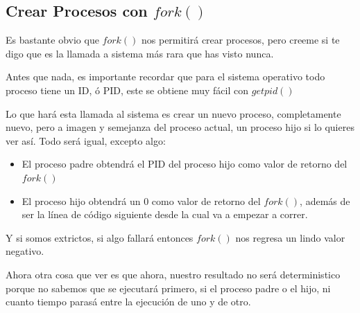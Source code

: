 \documentclass[12pt, fleqn]{report}                             %
\begin{document}
            \clearpage
            \subsection{Crear Procesos con $fork()$}

                Es bastante obvio que $fork()$ nos permitirá crear procesos,
                pero creeme si te digo que es la llamada a sistema más rara que has visto
                nunca.

                Antes que nada, es importante recordar que para el sistema operativo
                todo proceso tiene un ID, ó PID, este se obtiene muy fácil con $getpid()$

                Lo que hará esta llamada al sistema es crear un nuevo proceso, completamente
                nuevo, pero a imagen y semejanza del proceso actual, un proceso hijo
                si lo quieres ver así. Todo será igual, excepto algo:

                \begin{itemize}
                    \item El proceso padre obtendrá el PID del proceso hijo como valor
                        de retorno del $fork()$
                    \item El proceso hijo obtendrá un 0 como valor de retorno del
                    $fork()$, además de ser la línea de código siguiente desde la cual
                    va a empezar a correr.
                \end{itemize}

                Y si somos extrictos, si algo fallará entonces $fork()$ nos regresa
                un lindo valor negativo.

                Ahora otra cosa que ver es que ahora, nuestro resultado no será deterministico
                porque no sabemos que se ejecutará primero, si el proceso padre o el hijo, 
                ni cuanto tiempo parasá entre la ejecución de uno y de otro.

\end{document}
